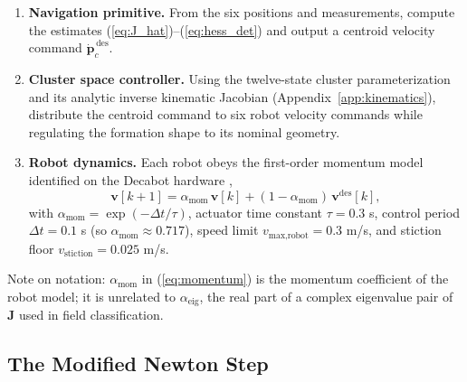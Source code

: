 \documentclass[lettersize,journal]{IEEEtran}
\begin{document}
\begin{enumerate}
    \item \textbf{Navigation primitive.} From the six positions and
          measurements, compute the estimates
          (\ref{eq:J_hat})--(\ref{eq:hess_det}) and output a centroid
          velocity command $\dot{\mathbf{p}}_c^{\,\text{des}}$.
    \item \textbf{Cluster space controller.} Using the twelve-state
          cluster parameterization and its analytic inverse kinematic
          Jacobian (Appendix~\ref{app:kinematics}), distribute the
          centroid command to six robot velocity commands while
          regulating the formation shape to its nominal geometry.
    \item \textbf{Robot dynamics.} Each robot obeys the first-order
          momentum model identified on the Decabot hardware \cite{14},
          \begin{equation}
              \mathbf{v}[k+1] = \alpha_{\text{mom}}\,\mathbf{v}[k]
              + (1 - \alpha_{\text{mom}})\,\mathbf{v}^{\text{des}}[k],
              \label{eq:momentum}
          \end{equation}
          with $\alpha_{\text{mom}} = \exp(-\Delta t/\tau)$, actuator
          time constant $\tau = 0.3$ s, control period $\Delta t = 0.1$ s
          (so $\alpha_{\text{mom}} \approx 0.717$), speed limit
          $v_{\text{max,robot}} = 0.3$ m/s, and stiction floor
          $v_{\text{stiction}} = 0.025$ m/s.
\end{enumerate}

Note on notation: $\alpha_{\text{mom}}$ in (\ref{eq:momentum}) is the
momentum coefficient of the robot model; it is unrelated to
$\alpha_{\text{eig}}$, the real part of a complex eigenvalue pair of
$\mathbf{J}$ used in field classification.

\subsection{The Modified Newton Step}
\label{sec:mod_newton}
\end{document}

